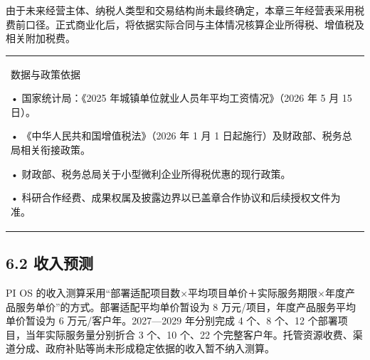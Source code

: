 由于未来经营主体、纳税人类型和交易结构尚未最终确定，本章三年经营表采用税费前口径。正式商业化后，将依据实际合同与主体情况核算企业所得税、增值税及相关附加税费。

\begin{longtable}[]{@{}
  >{\raggedright\arraybackslash}p{}@{}}
\toprule\noalign{}
\endhead
\bottomrule\noalign{}
\endlastfoot
\rowcolors{1}{WordTableStripe}{white}
数据与政策依据

• 国家统计局：《2025 年城镇单位就业人员年平均工资情况》（2026 年 5 月 15 日）。

• 《中华人民共和国增值税法》（2026 年 1 月 1 日起施行）及财政部、税务总局相关衔接政策。

• 财政部、税务总局关于小型微利企业所得税优惠的现行政策。

• 科研合作经费、成果权属及披露边界以已盖章合作协议和后续授权文件为准。 \\
\end{longtable}

\subsection{6.2 收入预测}\label{ux6536ux5165ux9884ux6d4b}

PI OS 的收入测算采用``部署适配项目数×平均项目单价＋实际服务期限×年度产品服务单价''的方式。部署适配平均单价暂设为 8 万元/项目，年度产品服务平均单价暂设为 6 万元/客户年。2027---2029 年分别完成 4 个、8 个、12 个部署项目，当年实际服务量分别折合 3 个、10 个、22 个完整客户年。托管资源收费、渠道分成、政府补贴等尚未形成稳定依据的收入暂不纳入测算。

